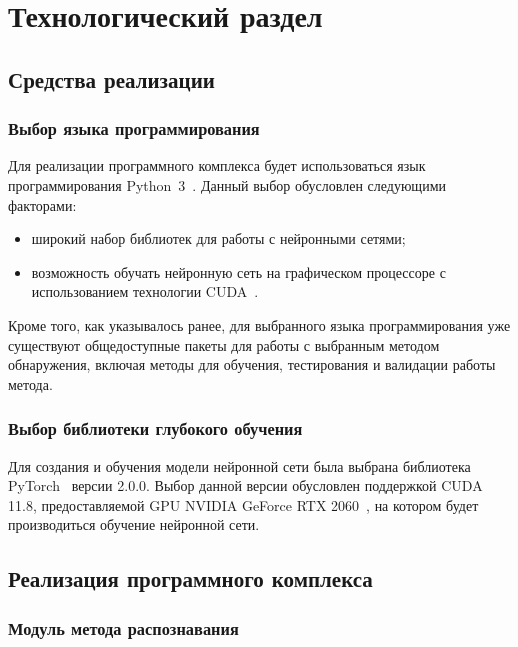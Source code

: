 \chapter{Технологический раздел}

\section{Средства реализации}

\subsection*{Выбор языка программирования}

Для реализации программного комплекса будет использоваться язык программирования Python~3~\cite{python3}. Данный выбор обусловлен следующими факторами:
\begin{itemize}[label=---]
    \item широкий набор библиотек для работы с нейронными сетями;
    \item возможность обучать нейронную сеть на графическом процессоре с
использованием технологии CUDA~\cite{cuda}.
\end{itemize}

Кроме того, как указывалось ранее, для выбранного языка программирования уже существуют общедоступные пакеты для работы с выбранным методом обнаружения, включая методы для обучения, тестирования и валидации работы метода.

\subsection*{Выбор библиотеки глубокого обучения}

Для создания и обучения модели нейронной сети была выбрана библиотека PyTorch~\cite{pytorch} версии 2.0.0. Выбор данной версии обусловлен поддержкой CUDA 11.8, предоставляемой GPU NVIDIA GeForce RTX 2060~\cite{rtx2060}, на котором будет производиться обучение нейронной сети.

\section{Реализация программного комплекса}

\subsection{Модуль метода распознавания}

